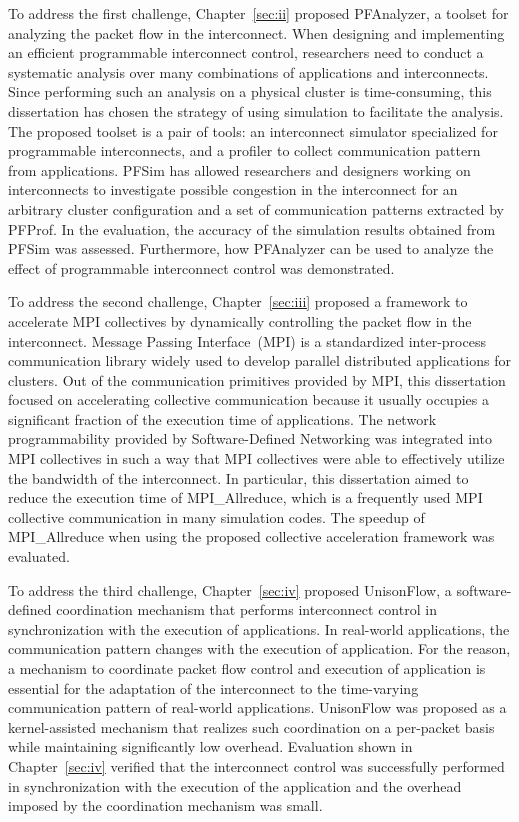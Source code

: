 To address the first challenge, Chapter~\ref{sec:ii} proposed PFAnalyzer, a
toolset for analyzing the packet flow in the interconnect. When designing and
implementing an efficient programmable interconnect control, researchers need
to conduct a systematic analysis over many combinations of applications and
interconnects. Since performing such an analysis on a physical cluster is
time-consuming, this dissertation has chosen the strategy of using simulation
to facilitate the analysis. The proposed toolset is a pair of tools: an
interconnect simulator specialized for programmable interconnects, and a
profiler to collect communication pattern from applications. PFSim has allowed
researchers and designers working on interconnects to investigate possible
congestion in the interconnect for an arbitrary cluster configuration and a
set of communication patterns extracted by PFProf. In the evaluation, the
accuracy of the simulation results obtained from PFSim was assessed.
Furthermore, how PFAnalyzer can be used to analyze the effect of programmable
interconnect control was demonstrated.

To address the second challenge, Chapter~\ref{sec:iii} proposed a framework to
accelerate MPI collectives by dynamically controlling the packet flow in the
interconnect. Message Passing Interface~(MPI) is a standardized inter-process
communication library widely used to develop parallel distributed
applications for clusters. Out of the communication primitives provided by
MPI, this dissertation focused on accelerating collective communication
because it usually occupies a significant fraction of the execution time of
applications. The network programmability provided by Software-Defined
Networking was integrated into MPI collectives in such a way that MPI
collectives were able to effectively utilize the bandwidth of the
interconnect. In particular, this dissertation aimed to reduce the execution
time of MPI\_Allreduce, which is a frequently used MPI collective
communication in many simulation codes. The speedup of MPI\_Allreduce when
using the proposed collective acceleration framework was evaluated.

To address the third challenge, Chapter~\ref{sec:iv} proposed UnisonFlow, a
software-defined coordination mechanism that performs interconnect control in
synchronization with the execution of applications. In real-world
applications, the communication pattern changes with the execution of
application. For the reason, a mechanism to coordinate packet flow control and
execution of application is essential for the adaptation of the interconnect to
the time-varying communication pattern of real-world applications. UnisonFlow
was proposed as a kernel-assisted mechanism that realizes such coordination on
a per-packet basis while maintaining significantly low overhead. Evaluation
shown in Chapter~\ref{sec:iv} verified that the interconnect control was
successfully performed in synchronization with the execution of the
application and the overhead imposed by the coordination mechanism was small.

